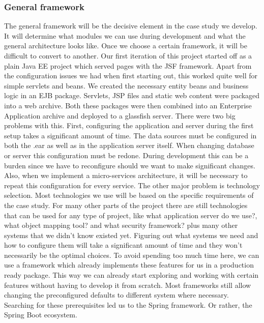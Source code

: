 \documentclass[12pt]{article}
\begin{document}
\begin{multicols}{2}
\subsubsection{General framework}\label{sec:framework}
The general framework will be the decisive element in the case study we develop. It will determine what modules we can use during development and what the general architecture looks like. Once we choose a certain framework, it will be difficult to convert to another. Our first iteration of this project started off as a plain Java EE project which served pages with the JSF framework. Apart from the configuration issues we had when first starting out, this worked quite well for simple servlets and beans. We created the necessary entity beans and business logic in an EJB package. Servlets, JSP files and static web content were packaged into a web archive. Both these packages were then combined into an Enterprise Application archive and deployed to a glassfish server. There were two big problems with this. First, configuring the application and server during the first setup takes a significant amount of time. The data sources must be configured in both the .ear as well as in the application server itself. When changing database or server this configuration must be redone. During development this can be a burden since we have to reconfigure should we want to make significant changes. Also, when we implement a micro-services architecture, it will be necessary to repeat this configuration for every service. The other major problem is technology selection. Most technologies we use will be based on the specific requirements of the case study. For many other parts of the project there are still technologies that can be used for any type of project, like what application server do we use?, what object mapping tool? and what security framework? plus many other systems that we didn't know existed yet. Figuring out what systems we need and how to configure them will take a significant amount of time and they won't necessarily be the optimal choices. To avoid spending too much time here, we can use a framework which already implements these features for us in a production ready package. This way we can already start exploring and working with certain features without having to develop it from scratch. Most frameworks still allow changing the preconfigured defaults to different system where necessary. Searching for these prerequisites led us to the Spring framework. Or rather, the Spring Boot ecosystem. 
\\\\

\end{multicols}
\end{document}
